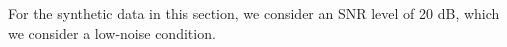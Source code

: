 For the synthetic data in this section, we consider an SNR level of 20 dB, which we consider a low-noise condition.



%
%
%
%
%

